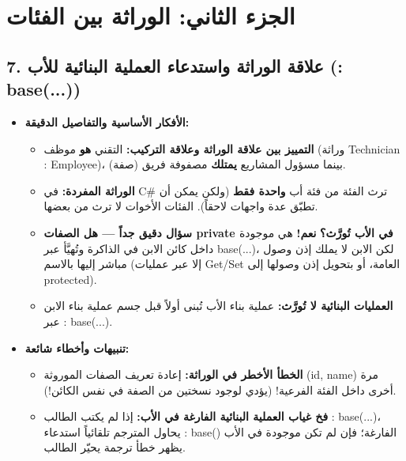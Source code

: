 \documentclass[14pt]{extarticle}
\begin{document}
\clearpage

\section*{الجزء الثاني: الوراثة بين الفئات}

\subsection*{7. علاقة الوراثة واستدعاء العملية البنائية للأب (\textenglish{: base(...)})}
\begin{itemize}[itemsep=0.3em]
    \item \textbf{الأفكار الأساسية والتفاصيل الدقيقة:}
    \begin{itemize}
        \item \textbf{التمييز بين علاقة الوراثة وعلاقة التركيب:} التقني \textbf{هو} موظف (وراثة \textenglish{Technician : Employee})، بينما مسؤول المشاريع \textbf{يمتلك} مصفوفة فريق (صفة).
        \item \textbf{الوراثة المفردة:} في \textenglish{C\#} ترث الفئة من فئة أب \textbf{واحدة فقط} (ولكن يمكن أن تطبّق عدة واجهات لاحقاً). الفئات الأخوات لا ترث من بعضها.
        \item \textbf{سؤال دقيق جداً — هل الصفات \textenglish{private} في الأب تُورَّث؟} \textbf{نعم!} هي موجودة داخل كائن الابن في الذاكرة وتُهيَّأ عبر \textenglish{base(...)}، لكن الابن لا يملك إذن وصول مباشر إليها بالاسم (إلا عبر عمليات \textenglish{Get}/\textenglish{Set} العامة، أو بتحويل إذن وصولها إلى \textenglish{protected}).
        \item \textbf{العمليات البنائية لا تُورَّث:} عملية بناء الأب تُبنى أولاً قبل جسم عملية بناء الابن عبر \textenglish{: base(...)}.
    \end{itemize}
    \item \textbf{تنبيهات وأخطاء شائعة:}
    \begin{itemize}
        \item \textbf{الخطأ الأخطر في الوراثة:} إعادة تعريف الصفات الموروثة (\textenglish{id, name}) مرة أخرى داخل الفئة الفرعية! (يؤدي لوجود نسختين من الصفة في نفس الكائن!).
        \item \textbf{فخ غياب العملية البنائية الفارغة في الأب:} إذا لم يكتب الطالب \textenglish{: base(...)}، يحاول المترجم تلقائياً استدعاء \textenglish{: base()} الفارغة؛ فإن لم تكن موجودة في الأب يظهر خطأ ترجمة يحيّر الطالب.
    \end{itemize}
\end{itemize}
\end{document}
